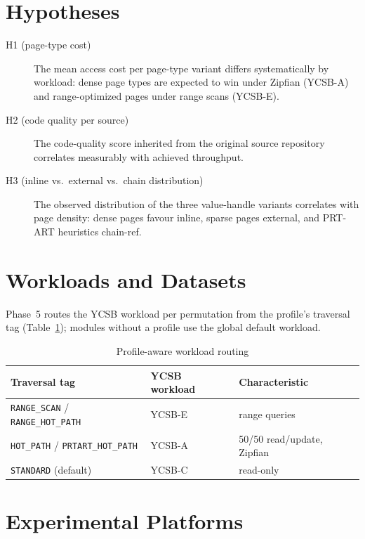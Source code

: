 \section{Hypotheses}\label{sec:hypotheses}

\begin{description}
  \item[H1 (page-type cost)] The mean access cost per page-type variant differs
        systematically by workload: dense page types are expected to win under Zipfian
        (YCSB-A) and range-optimized pages under range scans (YCSB-E).
  \item[H2 (code quality per source)] The code-quality score inherited from the original
        source repository correlates measurably with achieved throughput.
  \item[H3 (inline vs.\ external vs.\ chain distribution)] The observed distribution of the
        three value-handle variants correlates with page density: dense pages favour
        inline, sparse pages external, and PRT-ART heuristics chain-ref.
\end{description}

\section{Workloads and Datasets}\label{sec:workloads}

Phase~5 routes the YCSB workload per permutation from the profile's traversal tag
(Table~\ref{tab:workload-routing}); modules without a profile use the global default
workload.

\begin{table}[h]
\centering
\caption{Profile-aware workload routing}\label{tab:workload-routing}
\begin{tabular}{lll}
\toprule
\textbf{Traversal tag} & \textbf{YCSB workload} & \textbf{Characteristic} \\
\midrule
\texttt{RANGE\_SCAN} / \texttt{RANGE\_HOT\_PATH} & YCSB-E & range queries \\
\texttt{HOT\_PATH} / \texttt{PRTART\_HOT\_PATH} & YCSB-A & 50/50 read/update, Zipfian \\
\texttt{STANDARD} (default) & YCSB-C & read-only \\
\bottomrule
\end{tabular}
\end{table}

\section{Experimental Platforms}\label{sec:platforms}

